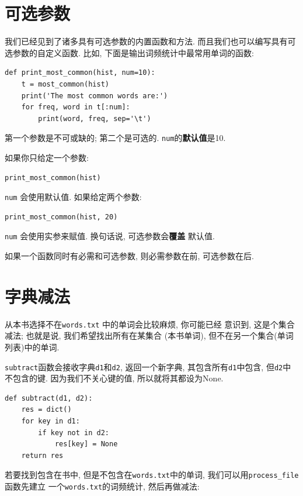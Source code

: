 \documentclass[10pt]{book}
\begin{document}
\section{可选参数}
我们已经见到了诸多具有可选参数的内置函数和方法. 
而且我们也可以编写具有可选参数的自定义函数. 
比如, 下面是输出词频统计中最常用单词的函数:

\begin{verbatim}
def print_most_common(hist, num=10):
    t = most_common(hist)
    print('The most common words are:')
    for freq, word in t[:num]:
        print(word, freq, sep='\t')
\end{verbatim}

第一个参数是不可或缺的; 第二个是可选的. 
{\tt num}的{\bf 默认值}是10.

如果你只给定一个参数:

\begin{verbatim}
print_most_common(hist)
\end{verbatim}

{\tt num} 会使用默认值. 如果给定两个参数:

\begin{verbatim}
print_most_common(hist, 20)
\end{verbatim}

{\tt num} 会使用实参来赋值. 
换句话说, 可选参数会{\bf 覆盖} 默认值.

如果一个函数同时有必需和可选参数, 
则必需参数在前, 可选参数在后. 


\section{字典减法}
\label{dictsub}
从本书选择不在{\tt words.txt} 中的单词会比较麻烦, 你可能已经
意识到, 这是个集合减法; 也就是说, 我们希望找出所有在某集合
(本书单词), 但不在另一个集合(单词列表)中的单词. 

{\tt subtract}函数会接收字典{\tt d1}和{\tt d2}, 返回一个新字典, 
其包含所有{\tt d1}中包含, 但{\tt d2}中不包含的键. 
因为我们不关心键的值, 所以就将其都设为None.

\begin{verbatim}
def subtract(d1, d2):
    res = dict()
    for key in d1:
        if key not in d2:
            res[key] = None
    return res
\end{verbatim}
%
若要找到包含在书中, 但是不包含在{\tt words.txt}中的单词, 
我们可以用\verb"process_file" 函数先建立
一个{\tt words.txt}的词频统计, 然后再做减法:
\end{document}
